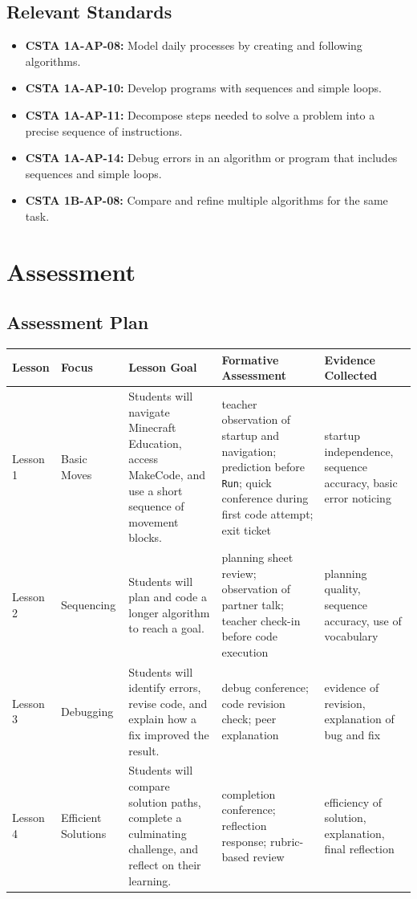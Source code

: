 \documentclass[12pt]{article}
\begin{document}
\subsection{Relevant Standards}

\begin{itemize}
\item \textbf{CSTA 1A-AP-08:} Model daily processes by creating and following algorithms.
\item \textbf{CSTA 1A-AP-10:} Develop programs with sequences and simple loops.
\item \textbf{CSTA 1A-AP-11:} Decompose steps needed to solve a problem into a precise sequence of instructions.
\item \textbf{CSTA 1A-AP-14:} Debug errors in an algorithm or program that includes sequences and simple loops.
\item \textbf{CSTA 1B-AP-08:} Compare and refine multiple algorithms for the same task.
\end{itemize}


\newpage
\section{Assessment}

\subsection{Assessment Plan}

\begin{longtable}{@{}P{0.7in}P{1.0in}P{1.4in}P{1.8in}P{1.3in}@{}}
\toprule
\textbf{Lesson} & \textbf{Focus} & \textbf{Lesson Goal} & \textbf{Formative Assessment} & \textbf{Evidence Collected} \\
\midrule
\endhead
Lesson 1 & Basic Moves & Students will navigate Minecraft Education, access MakeCode, and use a short sequence of movement blocks. & teacher observation of startup and navigation; prediction before \texttt{Run}; quick conference during first code attempt; exit ticket & startup independence, sequence accuracy, basic error noticing \\
\midrule
Lesson 2 & Sequencing & Students will plan and code a longer algorithm to reach a goal. & planning sheet review; observation of partner talk; teacher check-in before code execution & planning quality, sequence accuracy, use of vocabulary \\
\midrule
Lesson 3 & Debugging & Students will identify errors, revise code, and explain how a fix improved the result. & debug conference; code revision check; peer explanation & evidence of revision, explanation of bug and fix \\
\midrule
Lesson 4 & Efficient Solutions & Students will compare solution paths, complete a culminating challenge, and reflect on their learning. & completion conference; reflection response; rubric-based review & efficiency of solution, explanation, final reflection \\
\bottomrule
\end{longtable}
\end{document}
